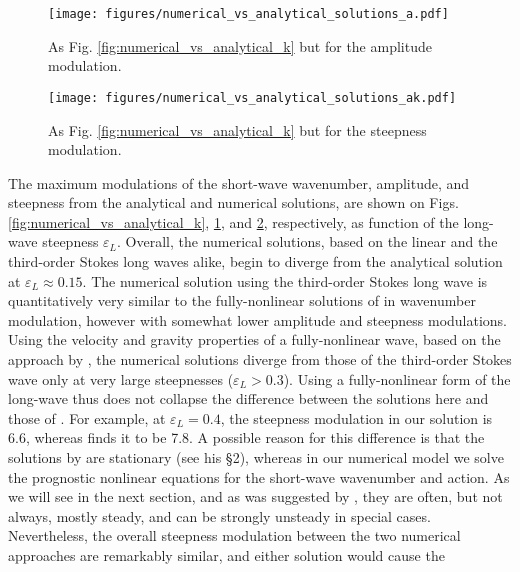 \documentclass[lineno]{jfm}
\begin{document}
\begin{figure}
\centering
\texttt{[image: figures/numerical\_vs\_analytical\_solutions\_a.pdf]}
\caption{
  As Fig. \ref{fig:numerical_vs_analytical_k} but for the amplitude modulation.
}
\label{fig:numerical_vs_analytical_a}
\end{figure}

\begin{figure}
\centering
\texttt{[image: figures/numerical\_vs\_analytical\_solutions\_ak.pdf]}
\caption{
  As Fig. \ref{fig:numerical_vs_analytical_k} but for the steepness modulation.
}
\label{fig:numerical_vs_analytical_ak}
\end{figure}

The maximum modulations of the short-wave wavenumber, amplitude, and steepness
from the analytical and numerical solutions, are shown on Figs.
\ref{fig:numerical_vs_analytical_k},
\ref{fig:numerical_vs_analytical_a}, and
\ref{fig:numerical_vs_analytical_ak}, respectively, as function of the long-wave
steepness $\varepsilon_L$.
Overall, the numerical solutions, based on the linear and the third-order Stokes
long waves alike, begin to diverge from the analytical solution at
$\varepsilon_L \approx 0.15$.
The numerical solution using the third-order Stokes long wave is quantitatively
very similar to the fully-nonlinear solutions of \citet{longuet1987propagation}
in wavenumber modulation, however with somewhat lower amplitude and steepness
modulations.
Using the velocity and gravity properties of a fully-nonlinear wave, based on
the approach by \citet{clamond2018accurate}, the numerical solutions diverge
from those of the third-order Stokes wave only at very large steepnesses
($\varepsilon_L > 0.3$).
Using a fully-nonlinear form of the long-wave thus does not collapse the
difference between the solutions here and those of \citet{longuet1987propagation}.
For example, at $\varepsilon_L = 0.4$, the steepness modulation in our solution
is 6.6, whereas \citet{longuet1987propagation} finds it to be 7.8.
A possible reason for this difference is that the solutions by
\citet{longuet1987propagation} are stationary (see his \S2), whereas in our
numerical model we solve the prognostic nonlinear equations for the short-wave
wavenumber and action.
As we will see in the next section, and as was suggested by \citet{peureux2021unsteady},
they are often, but not always, mostly steady, and can be strongly unsteady in
special cases.
Nevertheless, the overall steepness modulation between the two numerical
approaches are remarkably similar, and either solution would cause the
\end{document}
